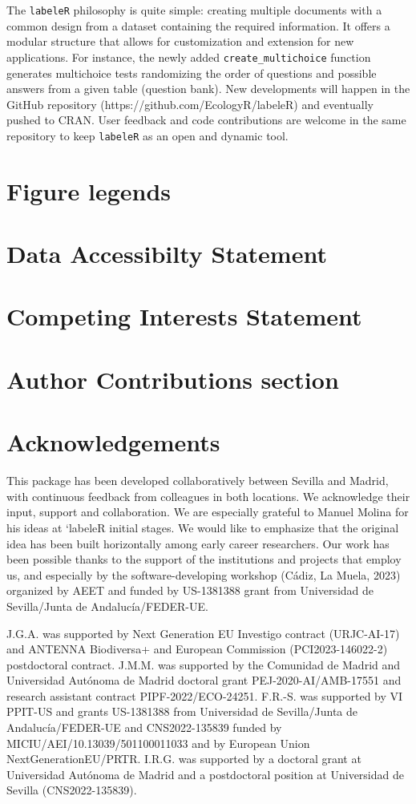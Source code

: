 \documentclass[draft,linenumbers]{agujournal2018}
\begin{document}
The \texttt{labeleR} philosophy is quite simple: creating multiple
documents with a common design from a dataset containing the required
information. It offers a modular structure that allows for customization
and extension for new applications. For instance, the newly added
\texttt{create\_multichoice} function generates multichoice tests
randomizing the order of questions and possible answers from a given
table (question bank). New developments will happen in the GitHub
repository (https://github.com/EcologyR/labeleR) and eventually pushed
to CRAN. User feedback and code contributions are welcome in the same
repository to keep \texttt{labeleR} as an open and dynamic tool.

\section{Figure legends}

\section{Data Accessibilty Statement}

\section{Competing Interests Statement}

\section{Author Contributions section}

\section{Acknowledgements}

This package has been developed collaboratively between Sevilla and
Madrid, with continuous feedback from colleagues in both locations. We
acknowledge their input, support and collaboration. We are especially
grateful to Manuel Molina for his ideas at `labeleR initial stages. We
would like to emphasize that the original idea has been built
horizontally among early career researchers. Our work has been possible
thanks to the support of the institutions and projects that employ us,
and especially by the software-developing workshop (Cádiz, La Muela,
2023) organized by AEET and funded by US-1381388 grant from Universidad
de Sevilla/Junta de Andalucía/FEDER-UE.

J.G.A. was supported by Next Generation EU Investigo contract
(URJC-AI-17) and ANTENNA Biodiversa+ and European Commission
(PCI2023-146022-2) postdoctoral contract. J.M.M. was supported by the
Comunidad de Madrid and Universidad Autónoma de Madrid doctoral grant
PEJ-2020-AI/AMB-17551 and research assistant contract
PIPF-2022/ECO-24251. F.R.-S. was supported by VI PPIT-US and grants
US-1381388 from Universidad de Sevilla/Junta de Andalucía/FEDER-UE and
CNS2022-135839 funded by MICIU/AEI/10.13039/501100011033 and by European
Union NextGenerationEU/PRTR. I.R.G. was supported by a doctoral grant at
Universidad Autónoma de Madrid and a postdoctoral position at
Universidad de Sevilla (CNS2022-135839).


\end{document}
